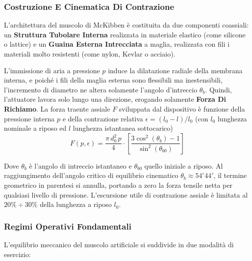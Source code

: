 ﻿\documentclass[11pt, a4paper]{article}
\begin{document}
\subsubsection{Costruzione E Cinematica Di Contrazione}
L'architettura del muscolo di McKibben è costituita da due componenti coassiali: un \textbf{Struttura Tubolare Interna} realizzata in materiale elastico (come silicone o lattice) e un \textbf{Guaina Esterna Intrecciata} a maglia, realizzata con fili i materiali molto resistenti (come nylon, Kevlar o acciaio).

L'immissione di aria a pressione $p$ induce la dilatazione radiale della membrana interna, e poiché i fili della maglia esterna sono flessibili ma inestensibili, l'incremento di diametro ne altera solamente l'angolo d'intreccio $\theta_b$. Quindi, l'attuatore lavora solo lungo una direzione, erogando solamente \textbf{Forza Di Richiamo}. La forza traente assiale $F$ sviluppata dal dispositivo è funzione della pressione interna $p$ e della contrazione relativa $\epsilon = (l_0 - l)/l_0$ (con $l_0$ lunghezza nominale a riposo ed $l$ lunghezza istantanea sottocarico)
\begin{equation}
    F(p, \epsilon) = \frac{\pi \, d_0^2 \, p}{4} \cdot \left[ \frac{3 \cos^2(\theta_b) - 1}{\sin^2(\theta_{b0})} \right]
\end{equation}

Dove $\theta_b$ è l'angolo di intreccio istantaneo e $\theta_{b0}$ quello iniziale a riposo. Al raggiungimento dell'angolo critico di equilibrio cinematico $\theta_b \approx 54^\circ 44'$, il termine geometrico in parentesi si annulla, portando a zero la forza tensile netta per qualsiasi livello di pressione. L'escursione utile di contrazione assiale è limitata al $20\% \div 30\%$ della lunghezza a riposo $l_0$.

\subsubsection{Regimi Operativi Fondamentali}

L'equilibrio meccanico del muscolo artificiale si suddivide in due modalità di esercizio:
\end{document}
